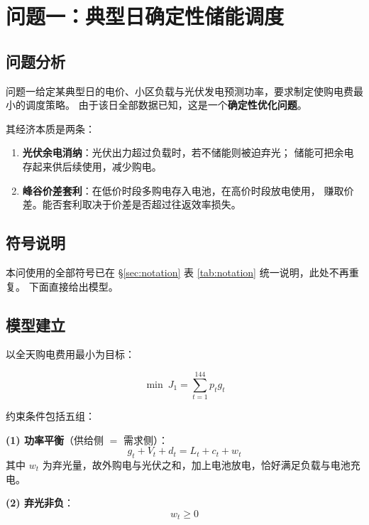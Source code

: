 ﻿%
\section{问题一：典型日确定性储能调度}

\subsection{问题分析}

问题一给定某典型日的电价、小区负载与光伏发电预测功率，要求制定使购电费最小的调度策略。
由于该日全部数据已知，这是一个\textbf{确定性优化问题}。

其经济本质是两条：
\begin{enumerate}[itemsep=2pt,topsep=3pt]
  \item \textbf{光伏余电消纳}：光伏出力超过负载时，若不储能则被迫弃光；
        储能可把余电存起来供后续使用，减少购电。
  \item \textbf{峰谷价差套利}：在低价时段多购电存入电池，在高价时段放电使用，
        赚取价差。能否套利取决于价差是否超过往返效率损失。
\end{enumerate}

\subsection{符号说明}

本问使用的全部符号已在 \S\ref{sec:notation} 表 \ref{tab:notation} 统一说明，此处不再重复。
下面直接给出模型。

\subsection{模型建立}
\label{sec:q1-model}

以全天购电费用最小为目标：

\begin{equation}
\min\ J_1=\sum_{t=1}^{144} p_t g_t
\label{eq:q1-obj}
\end{equation}

约束条件包括五组：

\textbf{(1) 功率平衡}（供给侧 $=$ 需求侧）：
\begin{equation}
g_t+V_t+d_t=L_t+c_t+w_t
\label{eq:q1-balance}
\end{equation}
其中 $w_t$ 为弃光量，故外购电与光伏之和，加上电池放电，恰好满足负载与电池充电。

\textbf{(2) 弃光非负}：
\begin{equation}
w_t\ge 0
\end{equation}

